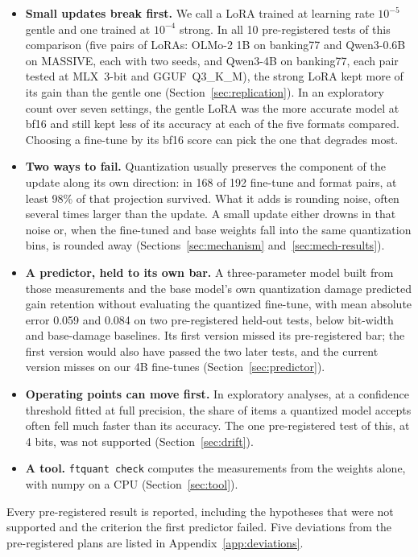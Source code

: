 \documentclass[11pt,letterpaper]{article}
\begin{document}
\begin{itemize}
\item \textbf{Small updates break first.} We call a LoRA trained at learning rate $10^{-5}$ gentle and one trained at $10^{-4}$ strong. In all 10 pre-registered tests of this comparison (five pairs of LoRAs: OLMo-2 1B on banking77 and Qwen3-0.6B on MASSIVE, each with two seeds, and Qwen3-4B on banking77, each pair tested at MLX~3-bit and GGUF~Q3\_K\_M), the strong LoRA kept more of its gain than the gentle one (Section~\ref{sec:replication}). In an exploratory count over seven settings, the gentle LoRA was the more accurate model at bf16 and still kept less of its accuracy at each of the five formats compared. Choosing a fine-tune by its bf16 score can pick the one that degrades most.
\item \textbf{Two ways to fail.} Quantization usually preserves the component of the update along its own direction: in 168 of 192 fine-tune and format pairs, at least 98\% of that projection survived. What it adds is rounding noise, often several times larger than the update. A small update either drowns in that noise or, when the fine-tuned and base weights fall into the same quantization bins, is rounded away (Sections~\ref{sec:mechanism} and~\ref{sec:mech-results}).
\item \textbf{A predictor, held to its own bar.} A three-parameter model built from those measurements and the base model's own quantization damage predicted gain retention without evaluating the quantized fine-tune, with mean absolute error 0.059 and 0.084 on two pre-registered held-out tests, below bit-width and base-damage baselines. Its first version missed its pre-registered bar; the first version would also have passed the two later tests, and the current version misses on our 4B fine-tunes (Section~\ref{sec:predictor}).
\item \textbf{Operating points can move first.} In exploratory analyses, at a confidence threshold fitted at full precision, the share of items a quantized model accepts often fell much faster than its accuracy. The one pre-registered test of this, at 4 bits, was not supported (Section~\ref{sec:drift}).
\item \textbf{A tool.} \texttt{ftquant check} computes the measurements from the weights alone, with numpy on a CPU (Section~\ref{sec:tool}).
\end{itemize}

Every pre-registered result is reported, including the hypotheses that were not supported and the criterion the first predictor failed. Five deviations from the pre-registered plans are listed in Appendix~\ref{app:deviations}.
\end{document}
